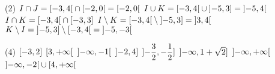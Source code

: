 \documentclass[a4paper,12pt]{report}
\begin{document}
\vspace*{-2\baselineskip}
\begin{core}
	\phantom{}
	\begin{tasks}(2)
		\task $I\cap J=\interval[open right]{-3}{4}\cap \interval[open right]{-2}{0}=\interval[open right]{-2}{0}$ 
		\task $I\cup K=\interval[open right]{-3}{4}\cup \interval[open left]{-5}{3}=\interval[open]{-5}{4}$
		\task $I\cap K=\interval[open right]{-3}{4}\cap \interval[]{-3}{3}$
		\task $I\setminus K=\interval[open right]{-3}{4}\setminus \interval[open left]{-5}{3}=\interval[open]{3}{4}$
		\task $K\setminus I=\interval[open left]{-5}{3}\setminus \interval[open right]{-3}{4}=\interval[open]{-5}{-3}$
	\end{tasks}
\end{core}
\begin{core}
	\phantom{}
	\begin{tasks}(4)
		\task $\interval[]{-3}{2}$
		\task $\interval[open right]{3}{+\infty}$
		\task $\interval[open]{-\infty}{-1}$
		\task $\interval[open left]{-2}{4}$
		\task $\interval[open left]{-\dfrac{3}{2}}{-\dfrac{1}{2}}$
		\task $\interval[open left]{-\infty}{1+\sqrt{2}}$
		\task $\interval[open]{-\infty}{+\infty}$
		\task $\interval[open]{-\infty}{-2}\cup \interval[open right]{4}{+\infty}$
	\end{tasks}
\end{core}
\def\firstcircle{(0,0) circle (1cm)}
\def\thirdcircle{(0:1cm) circle (1cm)}
\end{document}
